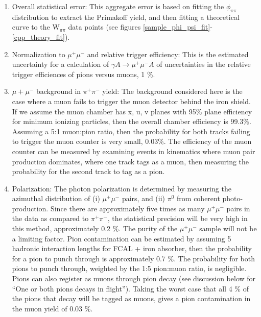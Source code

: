 \begin{enumerate}

\item
Overall statistical error:  This aggregate error is based on fitting the $\phi_{\pi \pi}$ distribution to
extract the Primakoff yield, and then fitting a theoretical curve to the W$_{\pi \pi}$ data points (see figures \ref{sample_phi_psi_fit}-\ref{cpp_theory_fit}).

\item
Normalization to $\mu^+ \mu^-$ and relative trigger efficiency: 
This is the estimated uncertainty for a calculation of $\gamma A \rightarrow \mu^+ \mu^- A$%
of uncertainties in the relative trigger efficiences of pions versus muons, 1 \%.  

\item
$\mu+ \mu^-$ background in $\pi^+ \pi^-$ yield: The background considered  here is the case where a muon fails to trigger the
muon detector behind the iron shield.  If we assume the muon chamber has x, u, v planes with 95\% plane efficiency for minimum ionizing particles, then
the overall chamber efficiency is 99.3\%. Assuming
a 5:1 muon:pion ratio, then the probability for both tracks failing to trigger the muon counter is very small, 0.03\%.
The efficiency of the muon counter can be measured by examining events in kinematics where muon pair production dominates, where one track tags as
a muon, then  measuring the  probability for the second track to tag as a pion.



\item
Polarization: The photon polarization is determined by measuring the azimuthal distribution of (i) $\mu^+ \mu^-$ pairs, and
(ii) $\pi^0$ from coherent photo-production.  Since there are approximately five times as many $\mu^+ \mu^-$ pairs in the data
as compared to $\pi^+ \pi^-$, the statistical precision will be very high in this method, approximately 0.2 \%.  The purity of the $\mu^+ \mu^-$
sample will not be a limiting factor. Pion contamination can be estimated by assuming
 5 hadronic interaction lengths for FCAL + iron absorber, then the  probability for a pion
to punch through is approximately 0.7 \%. The probability for both pions to punch through,  weighted by the 1:5 pion:muon ratio, is
negligible. Pions can also register as muons through pion decay (see discussion below for ``One or both pions decays in flight'').  
Taking the worst case that
all 4 \% of the pions that decay will be tagged as muons, gives a pion contamination in the muon yield of 0.03 \%.



\end{enumerate}

